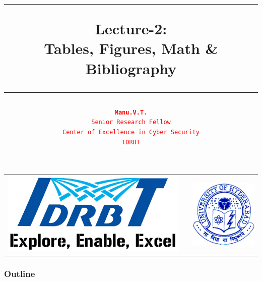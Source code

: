 \documentclass[12pt]{beamer}
\date{}
\title{\textcolor{idrbt_blue}{\rule{112mm}{1.25mm}} \textbf{Lecture-2:\\ Tables, Figures, Math \& Bibliography}
	 \textcolor{idrbt_blue}{\rule{112mm}{1.25mm}}}
\author{\textcolor{red}{\texttt{\textbf{Manu.V.T.}\\ 
			{\scriptsize Senior Research Fellow\\ Center of Excellence in Cyber Security\\IDRBT}}} }%
\begin{document}
	
	\begin{frame}
	\titlepage
	


\begin{center}
			\begin{tabular}{l>{\centering}p{6.25cm}<{\centering}l}
			\multirow{1}{*}{\includegraphics[scale=0.15]{./IDRBT_lowres.png}}
			&
         
			&
			\multirow{1}{*}{\includegraphics[scale=0.2]{./uoh.png}}
		\end{tabular}
\end{center}

\smallskip
	\renewcommand*{\arraystretch}{1.05}



\end{frame}

\begin{frame}
\frametitle{Outline}
\tableofcontents %
\end{frame}
\end{document}
